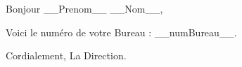 \documentclass{article}
\begin{document}
Bonjour __Prenom__ __Nom__,

Voici le numéro de votre Bureau : __numBureau__.

Cordialement,
La Direction.
\end{document}
